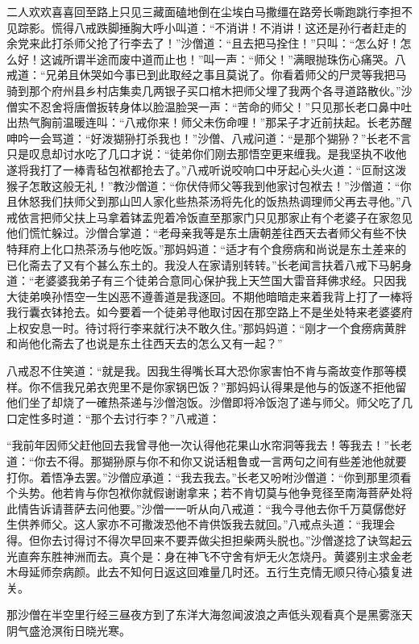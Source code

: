 \documentclass[12pt,UTF8]{ctexbook}
\begin{document}
二人欢欢喜喜回至路上只见三藏面磕地倒在尘埃白马撒缰在路旁长嘶跑跳行李担不见踪影。慌得八戒跌脚捶胸大呼小叫道：“不消讲！不消讲！这还是孙行者赶走的余党来此打杀师父抢了行李去了！”沙僧道：“且去把马拴住！”只叫：“怎么好！怎么好！这诚所谓半途而废中道而止也！”叫一声：“师父！”满眼抛珠伤心痛哭。八戒道：“兄弟且休哭如今事已到此取经之事且莫说了。你看着师父的尸灵等我把马骑到那个府州县乡村店集卖几两银子买口棺木把师父埋了我两个各寻道路散伙。”沙僧实不忍舍将唐僧扳转身体以脸温脸哭一声：“苦命的师父！”只见那长老口鼻中吐出热气胸前温暖连叫：“八戒你来！师父未伤命哩！”那呆子才近前扶起。长老苏醒呻吟一会骂道：“好泼猢狲打杀我也！”沙僧、八戒问道：“是那个猢狲？”长老不言只是叹息却讨水吃了几口才说：“徒弟你们刚去那悟空更来缠我。是我坚执不收他遂将我打了一棒青毡包袱都抢去了。”八戒听说咬响口中牙起心头火道：“叵耐这泼猴子怎敢这般无礼！”教沙僧道：“你伏侍师父等我到他家讨包袱去！”沙僧道：“你且休怒我们扶师父到那山凹人家化些热茶汤将先化的饭热热调理师父再去寻他。”八戒依言把师父扶上马拿着钵盂兜着冷饭直至那家门只见那家止有个老婆子在家忽见他们慌忙躲过。沙僧合掌道：“老母亲我等是东土唐朝差往西天去者师父有些不快特拜府上化口热茶汤与他吃饭。”那妈妈道：“适才有个食痨病和尚说是东土差来的已化斋去了又有个甚么东土的。我没人在家请别转转。”长老闻言扶着八戒下马躬身道：“老婆婆我弟子有三个徒弟合意同心保护我上天竺国大雷音拜佛求经。只因我大徒弟唤孙悟空一生凶恶不遵善道是我逐回。不期他暗暗走来着我背上打了一棒将我行囊衣钵抢去。如今要着一个徒弟寻他取讨因在那空路上不是坐处特来老婆婆府上权安息一时。待讨将行李来就行决不敢久住。”那妈妈道：“刚才一个食痨病黄胖和尚他化斋去了也说是东土往西天去的怎么又有一起？”

八戒忍不住笑道：“就是我。因我生得嘴长耳大恐你家害怕不肯与斋故变作那等模样。你不信我兄弟衣兜里不是你家锅巴饭？”那妈妈认得果是他与的饭遂不拒他留他们坐了却烧了一確热茶递与沙僧泡饭。沙僧即将冷饭泡了递与师父。师父吃了几口定性多时道：“那个去讨行李？”八戒道：

“我前年因师父赶他回去我曾寻他一次认得他花果山水帘洞等我去！等我去！”长老道：“你去不得。那猢狲原与你不和你又说话粗鲁或一言两句之间有些差池他就要打你。着悟净去罢。”沙僧应承道：“我去我去。”长老又吩咐沙僧道：“你到那里须看个头势。他若肯与你包袱你就假谢谢拿来；若不肯切莫与他争竞径至南海菩萨处将此情告诉请菩萨去问他要。”沙僧一一听从向八戒道：“我今寻他去你千万莫僝僽好生供养师父。这人家亦不可撒泼恐他不肯供饭我去就回。”八戒点头道：“我理会得。但你去讨得讨不得次早回来不要弄做尖担担柴两头脱也。”沙僧遂捻了诀驾起云光直奔东胜神洲而去。真个是：身在神飞不守舍有炉无火怎烧丹。黄婆别主求金老木母延师奈病颜。此去不知何日返这回难量几时还。五行生克情无顺只待心猿复进关。

那沙僧在半空里行经三昼夜方到了东洋大海忽闻波浪之声低头观看真个是黑雾涨天阴气盛沧溟衔日晓光寒。
\end{document}
